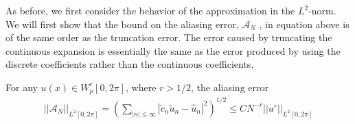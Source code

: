     As before, we first consider the behavior of the approximation in the $L^2$-norm. We will first show that the bound on the aliasing error, $\mathcal{A}_N$ , in equation above is of the same order as the truncation error. The error caused by truncating the continuous expansion is essentially the same as the error produced by using the discrete coefficients rather than the continuous coefficients.
    \begin{lemma}
    \label{estimating_aliasing_error}	
    For any $u(x) \in W_p^r [0, 2\pi]$, where $r > 1/2$, the aliasing error
    \begin{align*}
        || \mathcal{A}_N ||_{L^2 [0, 2\pi]} = \displaystyle \left(\sum_{|n| \leq \infty} |\widetilde{c}_n \widetilde{u}_n - \hat{u}_n|^2 \right)^{1/2} \leq CN^{-r} ||u^{r}||_{L^2 [0, 2\pi]}
    \end{align*}
	\end{lemma}
